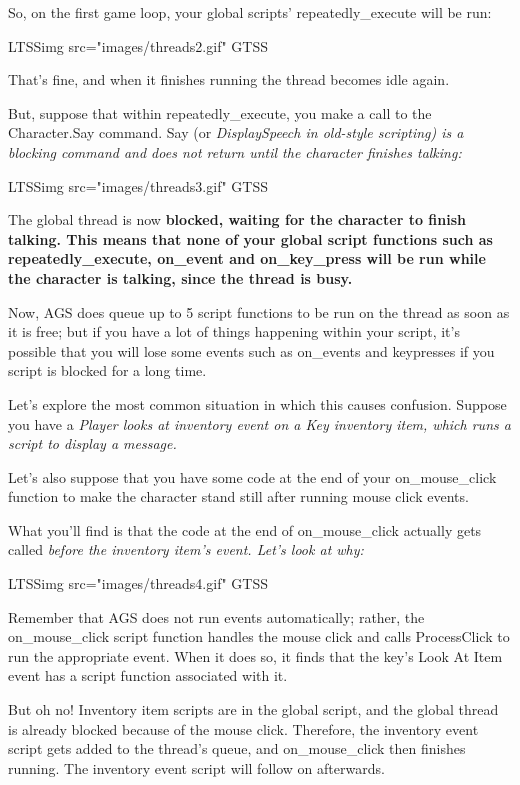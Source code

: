 So, on the first game loop, your global scripts' repeatedly_execute will be run:

LTSSimg src="images/threads2.gif" GTSS

That's fine, and when it finishes running the thread becomes idle again.

But, suppose that within repeatedly_execute, you make a call to the Character.Say
command. Say (or \it{DisplaySpeech} in old-style scripting) is a blocking command
and does not return until the character finishes talking:

LTSSimg src="images/threads3.gif" GTSS

The global thread is now \bf{blocked}, waiting for the character to
finish talking. This means that none of your global script functions such
as repeatedly_execute, on_event and on_key_press will be run while the character
is talking, since the thread is busy.

Now, AGS does queue up to 5 script functions to be run on the thread
as soon as it is free; but if you have a lot of things happening within your script,
it's possible that you will lose some events such as on_events and keypresses if
you script is blocked for a long time.

Let's explore the most common situation in which this causes confusion. Suppose you
have a \it{Player looks at inventory} event on a Key inventory item, which
runs a script to display a message.

Let's also suppose that you have some code at the end of your on_mouse_click function
to make the character stand still after running mouse click events.

What you'll find is that the code at the end of on_mouse_click actually gets called
\it{before} the inventory item's event. Let's look at why:

LTSSimg src="images/threads4.gif" GTSS

Remember that AGS does not run events automatically; rather, the on_mouse_click
script function handles the mouse click and calls ProcessClick to run the appropriate
event. When it does so, it finds that the key's Look At Item event has a script function
associated with it.

But oh no! Inventory item scripts are in the global script, and the global thread is
already blocked because of the mouse click. Therefore, the inventory event script
gets added to the thread's queue, and on_mouse_click then finishes running.
The inventory event script will follow on afterwards.

